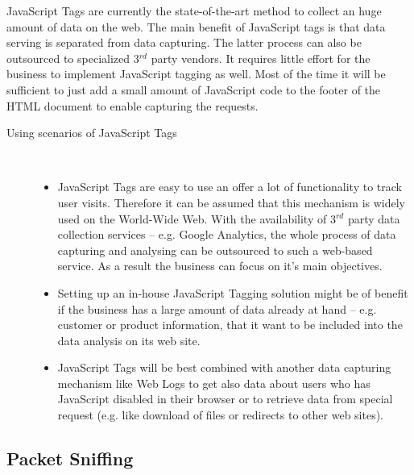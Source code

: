JavaScript Tags are currently the state-of-the-art method to collect an huge amount of data on the web. The main benefit of JavaScript tags is that data serving is separated from data capturing. The latter process can also be outsourced to specialized 3$^{rd}$ party vendors. It requires little effort for the business to implement JavaScript tagging as well. Most of the time it will be sufficient to just add a small amount of JavaScript code to the footer of the HTML document to enable capturing the requests.
\citep[p. 30-33]{Kaushik07}
\begin{description}
	\item[Using scenarios of JavaScript Tags]~\par
    \begin{itemize}
   		\item JavaScript Tags are easy to use an offer a lot of functionality to track user visits. Therefore it can be assumed that this mechanism is widely used on the World-Wide Web. With the availability of 3$^{rd}$ party data collection services -- e.g. Google Analytics, the whole process of data capturing and analysing can be outsourced to such a web-based service. As a result the business can focus on it's main objectives. 
        \item Setting up an in-house JavaScript Tagging solution might be of benefit if the business has a large amount of data already at hand -- e.g. customer or product information, that it want to be included into the data analysis on its web site.
        \item JavaScript Tags will be best combined with another data capturing mechanism like Web Logs to  get also data about users who has JavaScript disabled in their browser or to retrieve data from special request (e.g. like download of files or redirects to other web sites).
    \end{itemize}
\end{description}

\subsection{Packet Sniffing} %
\label{sub:packet_sniffing}

